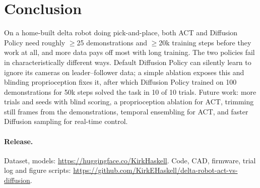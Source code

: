 \documentclass[10pt,twocolumn,letterpaper]{article}
\newcommand{\repo}{\url{https://github.com/KirkEHaskell/delta-robot-act-vs-diffusion}}
\newcommand{\hf}{\url{https://huggingface.co/KirkHaskell}}
\begin{document}
\section{Conclusion}

On a home-built delta robot doing pick-and-place, both ACT and Diffusion Policy need roughly
$\geq$25 demonstrations and $\geq$20k training steps before they work at all, and more data pays
off most with long training. The two policies fail in characteristically different ways. Default
Diffusion Policy can silently learn to ignore its cameras on leader--follower data; a simple
ablation exposes this and blinding proprioception fixes it, after which Diffusion Policy trained on
100 demonstrations for 50k steps solved the task in 10 of 10 trials. Future work: more trials and
seeds with blind scoring, a proprioception ablation for ACT, trimming still frames from the
demonstrations, temporal ensembling for ACT, and faster Diffusion sampling for real-time control.

\paragraph{Release.} Dataset, models: \hf. Code, CAD, firmware, trial log and figure scripts:
\repo.

\small


\end{document}
